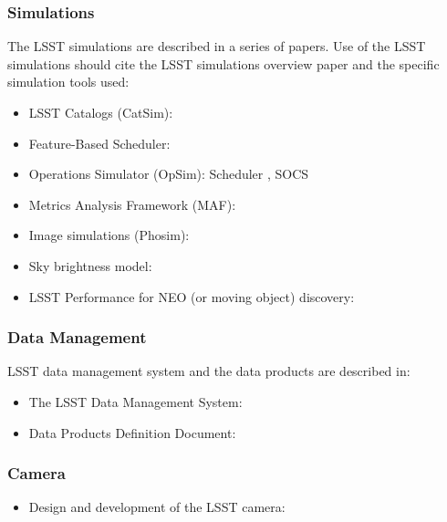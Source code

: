 \subsubsection{Simulations}

The LSST simulations are described in a series of papers. Use of the LSST simulations should cite the LSST simulations overview paper \cite{2014SPIE.9150E..14C} and the specific simulation tools used:

\begin{itemize}
\item LSST Catalogs (CatSim): \cite{2014SPIE.9150E..14C}
\item Feature-Based Scheduler: \cite{2018arXiv181004815N}
\item Operations Simulator (OpSim): Scheduler \cite{2016SPIE.9910E..13D}, SOCS \cite{2016SPIE.9911E..25R}
\item Metrics Analysis Framework (MAF): \cite{2014SPIE.9149E..0BJ}
\item Image simulations (Phosim): \cite{2015ApJS..218...14P}
\item Sky brightness model: \cite{2016SPIE.9910E..1AY}
\item LSST Performance for NEO (or moving object) discovery: \cite{2018Icar..303..181J}
\end{itemize}


\subsubsection{Data Management}

LSST data management system and the data products are described in:

\begin{itemize}
  \item The LSST Data Management System: \cite{2015arXiv151207914J}
  \item Data Products Definition Document: \cite{LSE-163}
\end{itemize}


\subsubsection{Camera}

\begin{itemize}
   \item Design and development of the LSST camera: \cite{2010SPIE.7735E..0JK}
\end{itemize}


